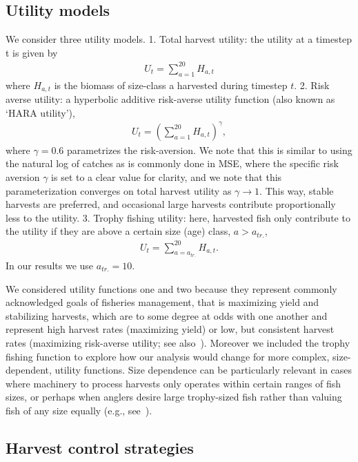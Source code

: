 \documentclass[floatfix,nofootinbib,longbibliography,notitlepage]{revtex4-2}
\begin{document}
\subsection{Utility models}

We consider three utility models. 
1. Total harvest utility: the utility at a timestep t is given by
\begin{align}
    U_t = \sum_{a=1}^{20} H_{a,t}
\end{align}
where $H_{a,t}$ is the biomass of size-class a harvested during timestep $t$. 
2. Risk averse utility: a hyperbolic additive risk-averse utility function (also known as ‘HARA utility’), 
\begin{align}
    U_t = \left(
    	\sum_{a=1}^{20} H_{a,t}
    \right)^\gamma,
\end{align}
where $\gamma=0.6$ parametrizes the risk-aversion. 
We note that this is similar to using the natural log of catches as is commonly done in MSE, where the specific risk aversion $\gamma$ is set to a clear value for clarity, and we note that this parameterization converges on total harvest utility as $\gamma\to1$.  
This way, stable harvests are preferred, and occasional large harvests contribute proportionally less to the utility. 
3. Trophy fishing utility: here, harvested fish only contribute to the utility if they are above a certain size (age) class, $a > a_{tr.}$,
\begin{align}
    U_t = \sum_{a=a_{tr.}}^{20} H_{a,t}.
\end{align}
In our results we use $a_{tr.}=10$.

We considered utility functions one and two because they represent commonly acknowledged goals of fisheries management, that is maximizing yield and stabilizing harvests, which are to some degree at odds with one another and represent high harvest rates (maximizing yield) or low, but consistent harvest rates (maximizing risk-averse utility; see also~\cite{walters-parma-1996,collie2021}).  
Moreover we included the trophy fishing function to explore how our analysis would change for more complex, size-dependent, utility functions. 
Size dependence can be particularly relevant in cases where machinery to process harvests only operates within certain ranges of fish sizes, or perhaps when anglers desire large trophy-sized fish rather than valuing fish of any size equally (e.g., see~\cite{murphy-willis-book}).

\subsection{Harvest control strategies}
\end{document}
